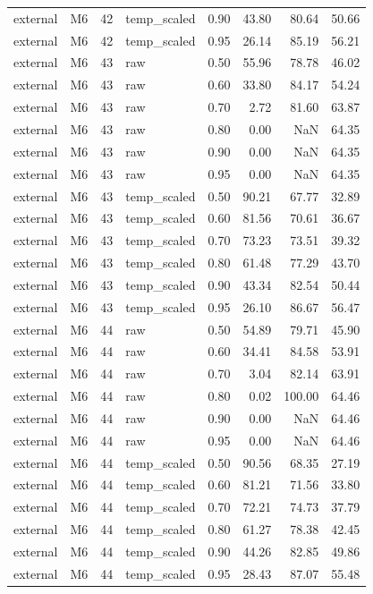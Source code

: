 \begin{tabular}{llrlrrrr}
external & M6 & 42 & temp\_scaled & 0.90 & 43.80 & 80.64 & 50.66 \\
external & M6 & 42 & temp\_scaled & 0.95 & 26.14 & 85.19 & 56.21 \\
external & M6 & 43 & raw & 0.50 & 55.96 & 78.78 & 46.02 \\
external & M6 & 43 & raw & 0.60 & 33.80 & 84.17 & 54.24 \\
external & M6 & 43 & raw & 0.70 & 2.72 & 81.60 & 63.87 \\
external & M6 & 43 & raw & 0.80 & 0.00 & NaN & 64.35 \\
external & M6 & 43 & raw & 0.90 & 0.00 & NaN & 64.35 \\
external & M6 & 43 & raw & 0.95 & 0.00 & NaN & 64.35 \\
external & M6 & 43 & temp\_scaled & 0.50 & 90.21 & 67.77 & 32.89 \\
external & M6 & 43 & temp\_scaled & 0.60 & 81.56 & 70.61 & 36.67 \\
external & M6 & 43 & temp\_scaled & 0.70 & 73.23 & 73.51 & 39.32 \\
external & M6 & 43 & temp\_scaled & 0.80 & 61.48 & 77.29 & 43.70 \\
external & M6 & 43 & temp\_scaled & 0.90 & 43.34 & 82.54 & 50.44 \\
external & M6 & 43 & temp\_scaled & 0.95 & 26.10 & 86.67 & 56.47 \\
external & M6 & 44 & raw & 0.50 & 54.89 & 79.71 & 45.90 \\
external & M6 & 44 & raw & 0.60 & 34.41 & 84.58 & 53.91 \\
external & M6 & 44 & raw & 0.70 & 3.04 & 82.14 & 63.91 \\
external & M6 & 44 & raw & 0.80 & 0.02 & 100.00 & 64.46 \\
external & M6 & 44 & raw & 0.90 & 0.00 & NaN & 64.46 \\
external & M6 & 44 & raw & 0.95 & 0.00 & NaN & 64.46 \\
external & M6 & 44 & temp\_scaled & 0.50 & 90.56 & 68.35 & 27.19 \\
external & M6 & 44 & temp\_scaled & 0.60 & 81.21 & 71.56 & 33.80 \\
external & M6 & 44 & temp\_scaled & 0.70 & 72.21 & 74.73 & 37.79 \\
external & M6 & 44 & temp\_scaled & 0.80 & 61.27 & 78.38 & 42.45 \\
external & M6 & 44 & temp\_scaled & 0.90 & 44.26 & 82.85 & 49.86 \\
external & M6 & 44 & temp\_scaled & 0.95 & 28.43 & 87.07 & 55.48 \\

\end{tabular}
